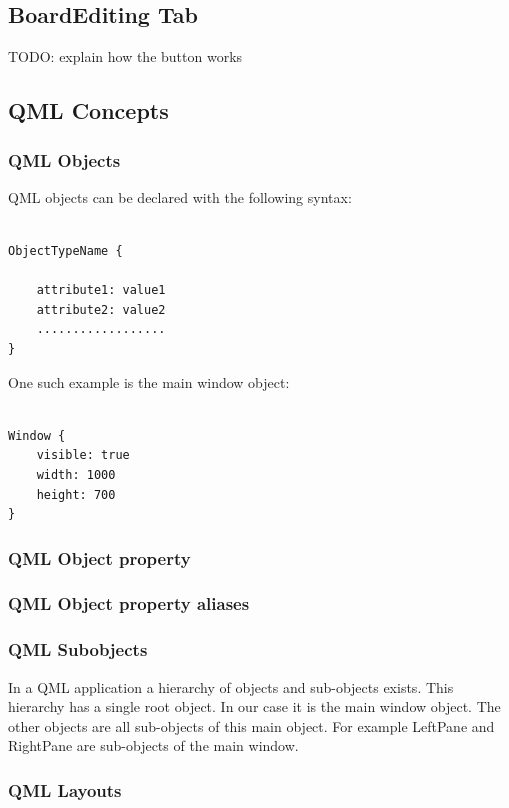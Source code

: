 \subsection {BoardEditing Tab}

TODO: explain how the button works

\subsection {QML Concepts}

\subsubsection {QML Objects}

QML objects can be declared with the following syntax: 

\begin{lstlisting}

ObjectTypeName {

	attribute1: value1
	attribute2: value2
	..................
}

\end{lstlisting}

One such example is the main window object:

\begin{lstlisting}

Window {
	visible: true
	width: 1000
	height: 700
}

\end{lstlisting}

\subsubsection {QML Object property}
\subsubsection {QML Object property aliases}
\subsubsection {QML Subobjects}

In a QML application a hierarchy of objects and sub-objects exists. This hierarchy has a single root object. In our case it is the main window object. The other objects are all sub-objects of this main object. 
For example LeftPane and RightPane are sub-objects of the main window. 

\subsubsection {QML Layouts}

